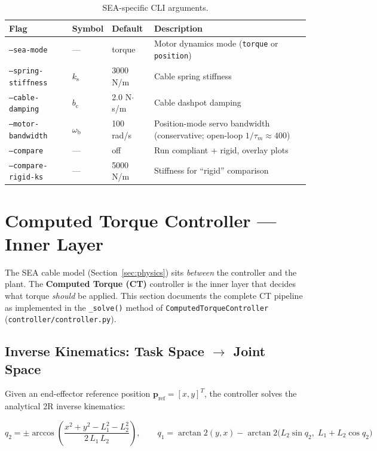 \documentclass[11pt,a4paper]{article}
\newcommand{\ks}{k_{\mathrm{s}}}
\newcommand{\bc}{b_{\mathrm{c}}}
\newcommand{\wb}{\omega_{\mathrm{b}}}
\begin{document}
\begin{table}[H]
\centering
\caption{SEA-specific CLI arguments.}
\begin{tabular}{llll}
\toprule
\textbf{Flag} & \textbf{Symbol} & \textbf{Default} & \textbf{Description} \\
\midrule
\texttt{--sea-mode}          & ---   & torque & Motor dynamics mode (\texttt{torque} or \texttt{position}) \\
\texttt{--spring-stiffness} & $\ks$ & 3000 N/m & Cable spring stiffness \\
\texttt{--cable-damping}    & $\bc$ & 2.0 N$\cdot$s/m & Cable dashpot damping \\
\texttt{--motor-bandwidth}  & $\wb$ & 100 rad/s & Position-mode servo bandwidth (conservative; open-loop $1/\tau_m \approx 400$) \\
\texttt{--compare}          & ---   & off & Run compliant + rigid, overlay plots \\
\texttt{--compare-rigid-ks} & ---   & 5000 N/m & Stiffness for ``rigid'' comparison \\
\bottomrule
\end{tabular}
\end{table}


\section{Computed Torque Controller --- Inner Layer}
\label{sec:ct}

The SEA cable model (Section~\ref{sec:physics}) sits \emph{between} the controller and the plant.  The \textbf{Computed Torque (CT)} controller is the inner layer that decides what torque \emph{should} be applied.  This section documents the complete CT pipeline as implemented in the \texttt{\_solve()} method of \texttt{ComputedTorqueController} (\texttt{controller/controller.py}).

\subsection{Inverse Kinematics: Task Space $\to$ Joint Space}

Given an end-effector reference position $\bm{p}_{\mathrm{ref}} = [x, y]^T$, the controller solves the analytical 2R inverse kinematics:

\begin{equation}
\boxed{
    q_2 = \pm\arccos\!\left(\frac{x^2 + y^2 - L_1^2 - L_2^2}{2\,L_1\,L_2}\right),\qquad
    q_1 = \arctan2(y, x) - \arctan2\!\bigl(L_2 \sin q_2,\; L_1 + L_2 \cos q_2\bigr)
}
\label{eq:ik}
\end{equation}
\end{document}
